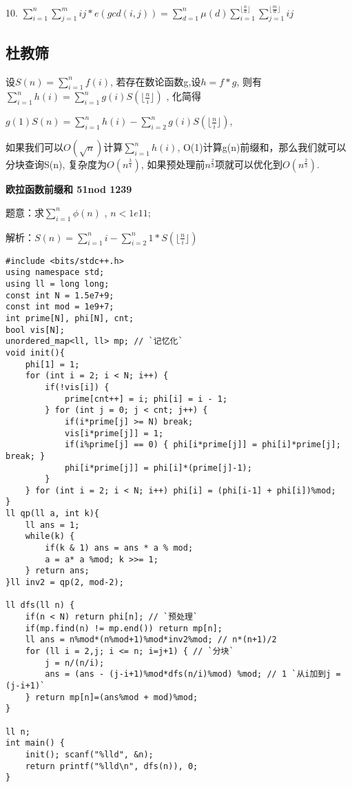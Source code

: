 10. $\sum_{i=1}^n\sum_{j=1}^mij * e(gcd(i,j)) = \sum_{d=1}^n \mu(d) \sum_{i=1}^{\lfloor \frac{n}{d}\rfloor}\sum_{j=1}^{\lfloor \frac{m}{d}\rfloor}ij$

\subsection{杜教筛}

设$S(n)  = \sum_{i=1}^n f(i)$, 若存在数论函数g,设$h=f*g$, 则有$\sum_{i=1}^{n}h(i)=\sum_{i=1}^ng(i)S(\lfloor \frac{n}{i} \rfloor)$ , 化简得

$g(1)S(n)=\sum_{i=1}^nh(i)-\sum_{i=2}^ng(i)S(\lfloor \frac{n}{i} \rfloor)$, 

如果我们可以$O(\sqrt{n})$计算$\sum_{i=1}^n h(i)​$, O(1)计算g(n)前缀和，那么我们就可以分块查询S(n), 复杂度为$O(n^{\frac{3}{4}})​$, 如果预处理前$n^{\frac{2}{3}}$项就可以优化到$O(n^{\frac{2}{3}})$.

{\bfseries 欧拉函数前缀和 51nod 1239}

题意：求$\sum_{i=1}^n \phi(n)$ , $n < 1e11;$

解析：$S(n)=\sum_{i=1}^n i - \sum_{i=2}^n 1 *S(\lfloor \frac{n}{i} \rfloor)$

\begin{lstlisting}
#include <bits/stdc++.h>
using namespace std;
using ll = long long;
const int N = 1.5e7+9;
const int mod = 1e9+7;
int prime[N], phi[N], cnt;
bool vis[N];
unordered_map<ll, ll> mp; // `记忆化`
void init(){ 
    phi[1] = 1;
    for (int i = 2; i < N; i++) {
        if(!vis[i]) {
            prime[cnt++] = i; phi[i] = i - 1;
        } for (int j = 0; j < cnt; j++) {
            if(i*prime[j] >= N) break;
            vis[i*prime[j]] = 1;
            if(i%prime[j] == 0) { phi[i*prime[j]] = phi[i]*prime[j]; break; }
            phi[i*prime[j]] = phi[i]*(prime[j]-1);
        }
    } for (int i = 2; i < N; i++) phi[i] = (phi[i-1] + phi[i])%mod;
}
ll qp(ll a, int k){
    ll ans = 1;
    while(k) {
        if(k & 1) ans = ans * a % mod;
        a = a* a %mod; k >>= 1;
    } return ans;
}ll inv2 = qp(2, mod-2);

ll dfs(ll n) {
    if(n < N) return phi[n]; // `预处理`
    if(mp.find(n) != mp.end()) return mp[n];
    ll ans = n%mod*(n%mod+1)%mod*inv2%mod; // n*(n+1)/2
    for (ll i = 2,j; i <= n; i=j+1) { // `分块`
        j = n/(n/i);
        ans = (ans - (j-i+1)%mod*dfs(n/i)%mod) %mod; // 1 `从i加到j = (j-i+1)`
    } return mp[n]=(ans%mod + mod)%mod;
}

ll n;
int main() {
    init(); scanf("%lld", &n);
    return printf("%lld\n", dfs(n)), 0;
}

\end{lstlisting}

